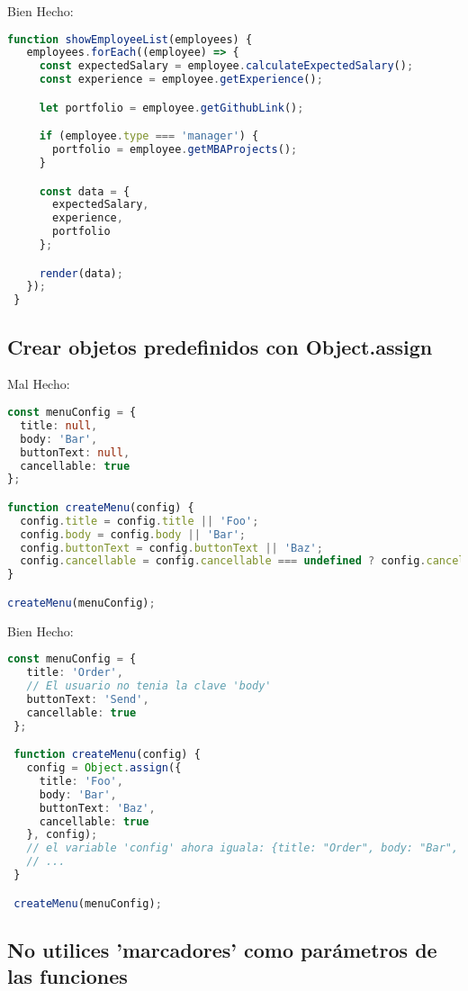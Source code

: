 Bien Hecho:
\begin{lstlisting}[language=TypeScript, style=goodstyle]
 function showEmployeeList(employees) {
   employees.forEach((employee) => {
     const expectedSalary = employee.calculateExpectedSalary();
     const experience = employee.getExperience();

     let portfolio = employee.getGithubLink();

     if (employee.type === 'manager') {
       portfolio = employee.getMBAProjects();
     }

     const data = {
       expectedSalary,
       experience,
       portfolio
     };

     render(data);
   });
 }
\end{lstlisting}
\newpage

\subsection*{Crear objetos predefinidos con Object.assign}

Mal Hecho:
\begin{lstlisting}[language=TypeScript, style=badstyle]
const menuConfig = {
  title: null,
  body: 'Bar',
  buttonText: null,
  cancellable: true
};

function createMenu(config) {
  config.title = config.title || 'Foo';
  config.body = config.body || 'Bar';
  config.buttonText = config.buttonText || 'Baz';
  config.cancellable = config.cancellable === undefined ? config.cancellable : true;
}

createMenu(menuConfig);
\end{lstlisting}
\vspace{0.5cm} %

Bien Hecho:
\begin{lstlisting}[language=TypeScript, style=goodstyle]
 const menuConfig = {
   title: 'Order',
   // El usuario no tenia la clave 'body'
   buttonText: 'Send',
   cancellable: true
 };

 function createMenu(config) {
   config = Object.assign({
     title: 'Foo',
     body: 'Bar',
     buttonText: 'Baz',
     cancellable: true
   }, config);
   // el variable 'config' ahora iguala: {title: "Order", body: "Bar", buttonText: "Send", cancellable: true}
   // ...
 }

 createMenu(menuConfig);
\end{lstlisting}
\newpage

\subsection*{No utilices 'marcadores' como parámetros de las funciones}

